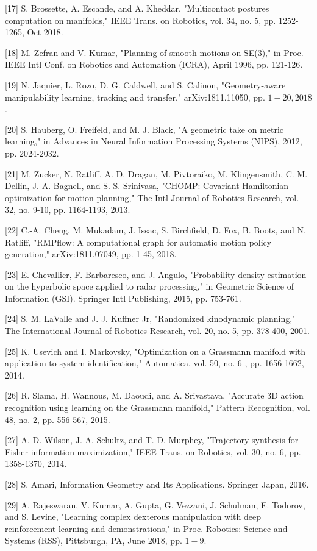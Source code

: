 \documentclass[10pt]{article}
\begin{document}
[17] S. Brossette, A. Escande, and A. Kheddar, "Multicontact postures computation on manifolds," IEEE Trans. on Robotics, vol. 34, no. 5, pp. 1252-1265, Oct 2018.

[18] M. Zefran and V. Kumar, "Planning of smooth motions on SE(3)," in Proc. IEEE Intl Conf. on Robotics and Automation (ICRA), April 1996, pp. 121-126.

[19] N. Jaquier, L. Rozo, D. G. Caldwell, and S. Calinon, "Geometry-aware manipulability learning, tracking and transfer," arXiv:1811.11050, pp. $1-20,2018$.

[20] S. Hauberg, O. Freifeld, and M. J. Black, "A geometric take on metric learning," in Advances in Neural Information Processing Systems (NIPS), 2012, pp. 2024-2032.

[21] M. Zucker, N. Ratliff, A. D. Dragan, M. Pivtoraiko, M. Klingensmith, C. M. Dellin, J. A. Bagnell, and S. S. Srinivasa, "CHOMP: Covariant Hamiltonian optimization for motion planning," The Intl Journal of Robotics Research, vol. 32, no. 9-10, pp. 1164-1193, 2013.

[22] C.-A. Cheng, M. Mukadam, J. Issac, S. Birchfield, D. Fox, B. Boots, and N. Ratliff, "RMPflow: A computational graph for automatic motion policy generation," arXiv:1811.07049, pp. 1-45, 2018.

[23] E. Chevallier, F. Barbaresco, and J. Angulo, "Probability density estimation on the hyperbolic space applied to radar processing," in Geometric Science of Information (GSI). Springer Intl Publishing, 2015, pp. 753-761.

[24] S. M. LaValle and J. J. Kuffner Jr, "Randomized kinodynamic planning," The International Journal of Robotics Research, vol. 20, no. 5, pp. 378-400, 2001.

[25] K. Usevich and I. Markovsky, "Optimization on a Grassmann manifold with application to system identification," Automatica, vol. 50, no. 6 , pp. 1656-1662, 2014.

[26] R. Slama, H. Wannous, M. Daoudi, and A. Srivastava, "Accurate 3D action recognition using learning on the Grassmann manifold," Pattern Recognition, vol. 48, no. 2, pp. 556-567, 2015.

[27] A. D. Wilson, J. A. Schultz, and T. D. Murphey, "Trajectory synthesis for Fisher information maximization," IEEE Trans. on Robotics, vol. 30, no. 6, pp. 1358-1370, 2014.

[28] S. Amari, Information Geometry and Its Applications. Springer Japan, 2016.

[29] A. Rajeswaran, V. Kumar, A. Gupta, G. Vezzani, J. Schulman, E. Todorov, and S. Levine, "Learning complex dexterous manipulation with deep reinforcement learning and demonstrations," in Proc. Robotics: Science and Systems (RSS), Pittsburgh, PA, June 2018, pp. $1-9$.
\end{document}

